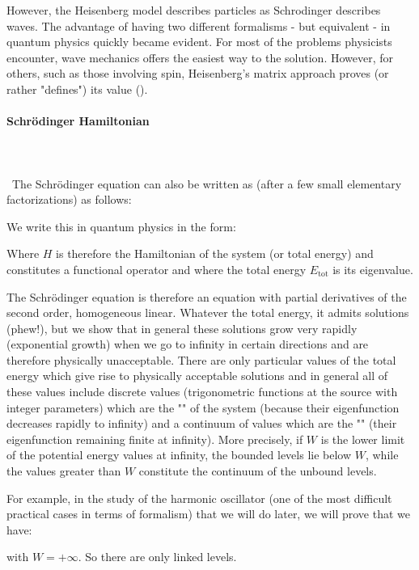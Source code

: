 	However, the Heisenberg model describes particles as Schrodinger describes waves. The advantage of having two different formalisms - but equivalent - in quantum physics quickly became evident. For most of the problems physicists encounter, wave mechanics offers the easiest way to the solution. However, for others, such as those involving spin, Heisenberg's matrix approach proves (or rather "defines") its value ().
	
	\paragraph{Schrödinger Hamiltonian}\label{schrödinger hamiltonian}\mbox{}\\\\\
	The Schrödinger equation can also be written as (after a few small elementary factorizations) as follows:
	
	We write this in quantum physics in the form:
	
	Where $H$ is therefore the Hamiltonian of the system (or total energy) and constitutes a functional operator and where the total energy $E_\text{tot}$ is its eigenvalue.
	
	The Schrödinger equation is therefore an equation with partial derivatives of the second order, homogeneous linear. Whatever the total energy, it admits solutions (phew!), but we show that in general these solutions grow very rapidly (exponential growth) when we go to infinity in certain directions and are therefore physically unacceptable. There are only particular values of the total energy which give rise to physically acceptable solutions and in general all of these values include discrete values (trigonometric functions at the source with integer parameters) which are the "" of the system (because their eigenfunction decreases rapidly to infinity) and a continuum of values which are the "" (their eigenfunction remaining finite at infinity). More precisely, if $W$ is the lower limit of the potential energy values at infinity, the bounded levels lie below $W$, while the values greater than $W$ constitute the continuum of the unbound levels.

	For example, in the study of the harmonic oscillator (one of the most difficult practical cases in terms of formalism) that we will do later, we will prove that we have:
	
	with $W=+\infty$. So there are only linked levels.

